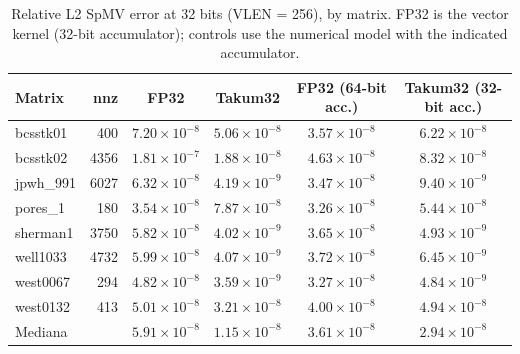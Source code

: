 \begin{table}[t]
\caption{Relative L2 SpMV error at 32 bits (VLEN = 256), by matrix. FP32 is the vector kernel (32-bit accumulator); controls use the numerical model with the indicated accumulator.}
\label{tab:precisao32}
\centering
\footnotesize
\begin{tabular}{@{}lrcccc@{}}
\toprule
Matrix & nnz & FP32 & Takum32 & FP32 (64-bit acc.) & Takum32 (32-bit acc.) \\
\midrule
bcsstk01 & 400 & $7.20 \times 10^{-8}$ & $5.06 \times 10^{-8}$ & $3.57 \times 10^{-8}$ & $6.22 \times 10^{-8}$ \\
bcsstk02 & 4356 & $1.81 \times 10^{-7}$ & $1.88 \times 10^{-8}$ & $4.63 \times 10^{-8}$ & $8.32 \times 10^{-8}$ \\
jpwh\_991 & 6027 & $6.32 \times 10^{-8}$ & $4.19 \times 10^{-9}$ & $3.47 \times 10^{-8}$ & $9.40 \times 10^{-9}$ \\
pores\_1 & 180 & $3.54 \times 10^{-8}$ & $7.87 \times 10^{-8}$ & $3.26 \times 10^{-8}$ & $5.44 \times 10^{-8}$ \\
sherman1 & 3750 & $5.82 \times 10^{-8}$ & $4.02 \times 10^{-9}$ & $3.65 \times 10^{-8}$ & $4.93 \times 10^{-9}$ \\
well1033 & 4732 & $5.99 \times 10^{-8}$ & $4.07 \times 10^{-9}$ & $3.72 \times 10^{-8}$ & $6.45 \times 10^{-9}$ \\
west0067 & 294 & $4.82 \times 10^{-8}$ & $3.59 \times 10^{-9}$ & $3.27 \times 10^{-8}$ & $4.84 \times 10^{-9}$ \\
west0132 & 413 & $5.01 \times 10^{-8}$ & $3.21 \times 10^{-8}$ & $4.00 \times 10^{-8}$ & $4.94 \times 10^{-8}$ \\
\midrule
Mediana & & $5.91 \times 10^{-8}$ & $1.15 \times 10^{-8}$ & $3.61 \times 10^{-8}$ & $2.94 \times 10^{-8}$ \\
\bottomrule
\end{tabular}
\end{table}
